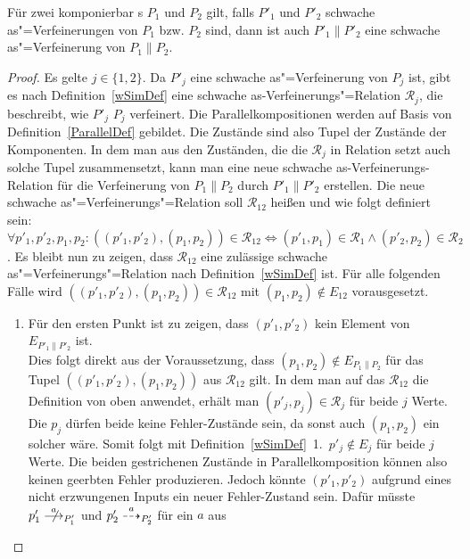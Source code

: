 \begin{Lem}
  \label{schwVerfParallelLem}
  Für zwei komponierbar \MEIO{}s $P_1$ und $P_2$ gilt, falls $P'_1$ und $P'_2$
  schwache as"=Verfeinerungen von $P_1$ bzw. $P_2$ sind, dann ist auch
  $P'_1\|P'_2$ eine schwache as"=Verfeinerung von $P_1\|P_2$.
\end{Lem}
\begin{proof}
  Es gelte $j\in\{1,2\}$. Da $P'_j$ eine schwache as"=Verfeinerung von $P_j$
  ist, gibt es nach Definition~\ref{wSimDef} eine schwache
  as-Verfeinerungs"=Relation $\mathcal{R}_j$, die beschreibt, wie $P'_j$ $P_j$
  verfeinert. Die Parallelkompositionen werden auf Basis von
  Definition~\ref{ParallelDef} gebildet. Die Zustände sind also Tupel der
  Zustände der Komponenten. In dem man aus den Zuständen, die die
  $\mathcal{R}_j$ in Relation setzt auch solche Tupel zusammensetzt, kann man
  eine neue schwache as-Verfeinerungs-Relation für die Verfeinerung von
  $P_1\|P_2$ durch $P'_1\|P'_2$ erstellen. Die neue schwache
  as"=Verfeinerungs"=Relation soll $\mathcal{R}_{12}$ heißen und wie folgt
  definiert sein: $\forall p'_1,p'_2,p_1,p_2:
  ((p'_1,p'_2),(p_1,p_2))\in\mathcal{R}_{12} \Leftrightarrow
  (p'_1,p_1)\in\mathcal{R}_1 \land (p'_2,p_2)\in\mathcal{R}_2$. Es bleibt nun
  zu zeigen, dass $\mathcal{R}_{12}$ eine zulässige schwache
  as"=Verfeinerungs"=Relation nach Definition~\ref{wSimDef} ist. Für alle
  folgenden Fälle wird $((p'_1,p'_2),(p_1,p_2))\in\mathcal{R}_{12}$ mit
  $(p_1,p_2)\notin E_{12}$ vorausgesetzt.
  \begin{enumerate}
    \item Für den ersten Punkt ist zu zeigen, dass $(p'_1,p'_2)$ kein Element
      von $E_{P'_1\|P'_2}$ ist.\\
      Dies folgt direkt aus der Voraussetzung, dass $(p_1,p_2)\notin
      E_{P_1\|P_2}$ für das Tupel $((p'_1,p'_2),(p_1,p_2))$ aus
      $\mathcal{R}_{12}$ gilt. In dem man auf das $\mathcal{R}_{12}$ die
      Definition von oben anwendet, erhält man $(p'_j,p_j)\in\mathcal{R}_j$ für
      beide $j$ Werte. Die $p_j$ dürfen beide keine Fehler-Zustände sein, da
      sonst auch $(p_1,p_2)$ ein solcher wäre. Somit folgt mit
      Definition~\ref{wSimDef}~1.\ $p'_j\notin E_j$ für beide $j$ Werte. Die
      beiden gestrichenen Zustände in Parallelkomposition können also keinen
      geerbten Fehler produzieren. Jedoch könnte $(p'_1,p'_2)$ aufgrund eines
      nicht erzwungenen Inputs ein neuer Fehler-Zustand sein. Dafür müsste
      \oBdA{} $p'_1\nmust[a]_{P'_1}$ und $p'_2\may[a]_{P'_2}$ für ein $a$ aus

\end{enumerate}
\end{proof}
